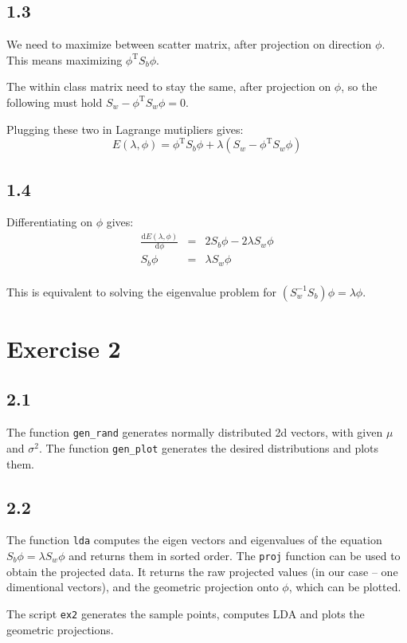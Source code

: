 \documentclass[a4paper]{article}
\def\d{\mathrm{d}}
\def\T{\mathrm{T}}
\begin{document}
\subsection*{1.3}

We need to maximize between scatter matrix, after projection on direction
$ \phi $. This means maximizing $ \phi^\T S_b \phi $.

The within class matrix need to stay the same, after projection on $ \phi $, so
the following must hold $ S_w - \phi^\T S_w \phi = 0 $.

Plugging these two in Lagrange mutipliers gives:
\[
  E(\lambda, \phi) = \phi^\T S_b \phi + \lambda(S_w - \phi^\T S_w \phi)
\]

\subsection*{1.4}

Differentiating on $ \phi $ gives:
\begin{eqnarray*}
\frac{\d E(\lambda, \phi)}{\d \phi} &=& 2 S_b \phi - 2 \lambda S_w \phi \\
S_b \phi &=& \lambda S_w \phi \\
\end{eqnarray*}

This is equivalent to solving the eigenvalue problem for $ (S_w^{-1} S_b) \phi
= \lambda \phi $.

\section*{Exercise 2}

\subsection*{2.1}

The function \texttt{gen\_rand} generates normally distributed 2d vectors, with
given $ \mu $ and $ \sigma^2 $. The function \texttt{gen\_plot} generates the
desired distributions and plots them.

\subsection*{2.2}

The function \texttt{lda} computes the eigen vectors and eigenvalues of the
equation $ S_b \phi = \lambda S_w \phi $ and returns them in sorted order. The
\texttt{proj} function can be used to obtain the projected data. It returns the
raw projected values (in our case -- one dimentional vectors), and the
geometric projection onto $ \phi $, which can be plotted.

The script \texttt{ex2} generates the sample points, computes LDA and plots the
geometric projections.
\end{document}
